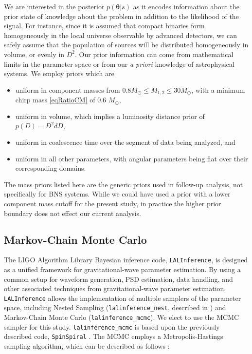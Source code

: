 \documentclass[11pt,a4paper]{emulateapj}
\newcommand{\thpara}{\boldsymbol{\theta}}
\begin{document}
We are interested in the posterior $p(\thpara | s)$ as it encodes information about the
prior state of knowledge about the problem in addition to the likelihood of the signal.
  For instance, since it is assumed that compact binaries
form homogeneously in the local universe observable by advanced detectors,
 we can safely assume that the population of
sources will be distributed homogeneously in volume, or evenly in $D^2$. 
 Our prior information can come from mathematical limits in the parameter space or
from our \textit{a priori} knowledge of astrophysical systems.  We employ priors which are

\begin{itemize}
\item uniform in component masses from $0.8M_{\odot} \leq M_{1,2} \leq 30M_{\odot}$, with a minimum chirp mass  \eqref{eqRatioCM} of 0.6 $M_{\odot}$,
\item uniform in volume, which implies a luminosity distance prior of $p(D) = D^2 dD$,
\item uniform in coalescence time over the segment of data being analyzed, and
\item uniform in all other parameters, with angular parameters being flat over their corresponding domains.
\end{itemize}

\noindent  The mass priors listed here are the generic priors used in follow-up analysis, not specifically for BNS systems.  While we could have used a prior with a lower component mass cutoff for the present study, in practice the higher prior boundary does not effect our current analysis.


  
\subsection{Markov-Chain Monte Carlo}
\label{MCMCSection}
  
The LIGO Algorithm Library Bayesian inference code, \texttt{LALInference}, is designed as 
a unified framework for gravitational-wave parameter estimation.  By using a common setup for 
waveform generation, PSD estimation, data handling, and other associated techniques from gravitational-wave parameter estimation, \texttt{LALInference} allows the implementation of multiple samplers of the parameter space, including Nested Sampling (\texttt{lalinference\_nest}, described in \cite{nestedsampling2010}) and Markov-Chain Monte Carlo (\texttt{lalinference\_mcmc}).  We elect to use the MCMC sampler for this study.  \texttt{lalinference\_mcmc} is based upon the previously described code, 
\texttt{SpinSpiral} \citep{spinspiral2009, spinspiral2010}.  The MCMC employs a Metropolis-Hastings sampling algorithm, which can be described as follows \citep{Gilks99}:
  
\end{document}
